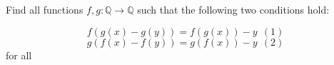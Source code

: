 Find all functions $f,g: \mathbb{Q}\to \mathbb{Q}$ such that the following two conditions hold:

$$f(g(x)-g(y))=f(g(x))-y \ \  (1)$$
$$g(f(x)-f(y))=g(f(x))-y\ \ (2)$$
for all 